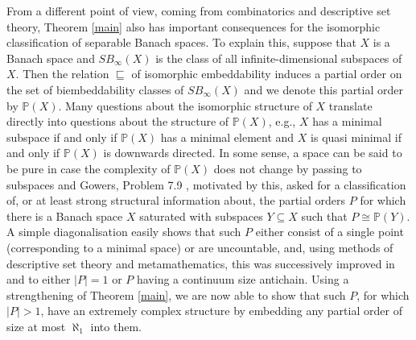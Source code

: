 \documentclass[10pt]{amsart}
\numberwithin{equation}{section}
\begin{document}
From a different point of view, coming from combinatorics and descriptive set
theory, Theorem \ref{main} also has important consequences for the isomorphic
classification of separable Banach spaces.  To explain this, suppose that $X$
is a Banach space and $SB_\infty(X)$ is the class of all infinite-dimensional
subspaces of $X$. Then the relation $\sqsubseteq$ of isomorphic embeddability
induces a partial order on the set of biembeddability classes of $SB_\infty(X)$
and we denote this partial order by ${\mathbb P}(X)$. Many questions about the
isomorphic structure of $X$ translate directly into questions about the
structure of ${\mathbb P}(X)$, e.g., $X$ has a minimal subspace if and only if ${\mathbb P}(X)$
has a minimal element and $X$ is quasi minimal if and only if ${\mathbb P}(X)$ is
downwards directed. In some sense, a space can be said to be pure in case the
complexity of ${\mathbb P}(X)$ does not change by passing to subspaces and Gowers,
Problem 7.9 \cite{g:dicho}, motivated by this, asked for a classification of,
or at least strong structural information about, the partial orders $P$ for
which there is a Banach space $X$ saturated with subspaces $Y\subseteq X$ such
that $P{\cong} {\mathbb P}(Y)$. A simple diagonalisation easily shows that such $P$ either
consist of a single point (corresponding to a minimal space) or are
uncountable, and, using methods of descriptive set theory and metamathematics,
this was successively improved in \cite{ergodic} and \cite{incomparable} to
either $|P|=1$ or $P$ having a continuum size antichain. Using a strengthening
of Theorem \ref{main}, we are now able to show that such $P$, for which
$|P|>1$, have an extremely complex structure by embedding any partial order of
size at most $\aleph_1$ into them.
\end{document}
